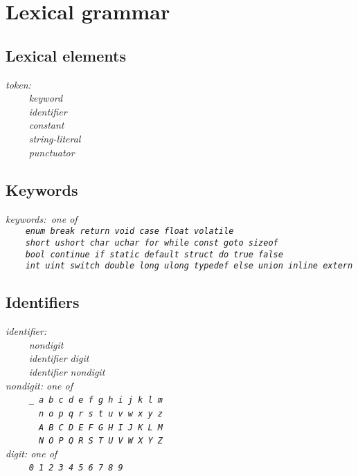 \documentclass[12pt]{report}
\def\|{\verb|}
\begin{document}
\chapter{Lexical grammar}
\rm
\section{Lexical elements}
\it
\noindent
token:\\
\|    | keyword\\
\|    | identifier\\
\|    | constant\\
\|    | string-literal\\
\|    | punctuator\\

\rm
\section{Keywords}
\it
\noindent
keywords: {\rm one of}\\
\|    | \verb+enum break return void case float volatile+ \\
\|    | \verb+short ushort char uchar for while const goto sizeof+ \\
\|    | \verb+bool continue if static default struct do true false+ \\
\|    | \verb+int uint switch double long ulong typedef else union inline extern+ \\

\rm
\section{Identifiers}
\it
\noindent
identifier:\\
\|    | nondigit\\
\|    | identifier digit\\
\|    | identifier nondigit\\

\noindent
nondigit: {\rm one of}\\
\|    | \verb+_ a b c d e f g h i j k l m+\\
\|    | \verb+  n o p q r s t u v w x y z+\\
\|    | \verb+  A B C D E F G H I J K L M+\\
\|    | \verb+  N O P Q R S T U V W X Y Z+\\

\noindent
digit: {\rm one of}\\
\|    | \verb+0 1 2 3 4 5 6 7 8 9+\\
\end{document}
